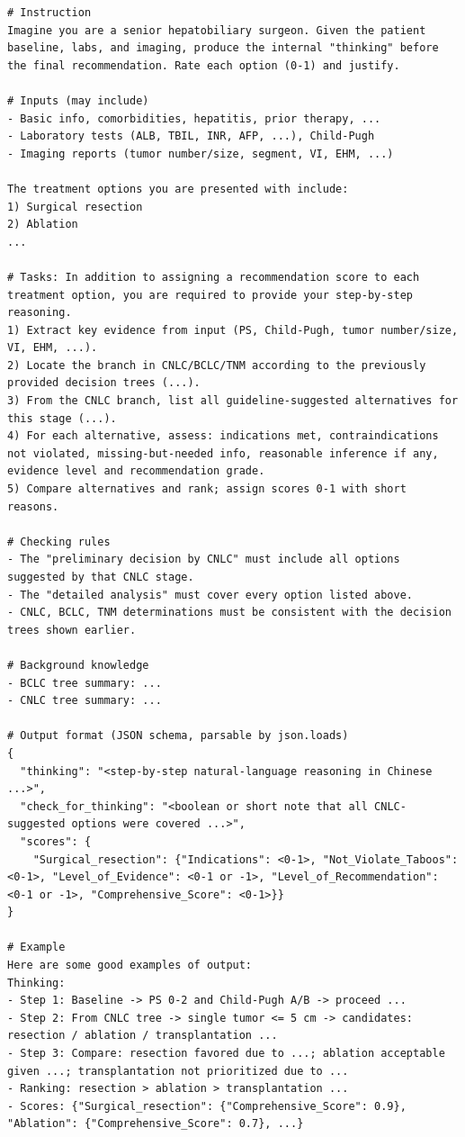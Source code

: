 \documentclass{article}
\begin{document}
\begin{appendices}
\begin{lstlisting}[style=promptmono,floatplacement=H,caption={Clinical-Reasoning prompt for generating thinking data},label={lst:hcc_prompt_thinking}]
# Instruction
Imagine you are a senior hepatobiliary surgeon. Given the patient baseline, labs, and imaging, produce the internal "thinking" before the final recommendation. Rate each option (0-1) and justify.

# Inputs (may include)
- Basic info, comorbidities, hepatitis, prior therapy, ...
- Laboratory tests (ALB, TBIL, INR, AFP, ...), Child-Pugh
- Imaging reports (tumor number/size, segment, VI, EHM, ...)

The treatment options you are presented with include:
1) Surgical resection
2) Ablation
...

# Tasks: In addition to assigning a recommendation score to each treatment option, you are required to provide your step-by-step reasoning. 
1) Extract key evidence from input (PS, Child-Pugh, tumor number/size, VI, EHM, ...).
2) Locate the branch in CNLC/BCLC/TNM according to the previously provided decision trees (...).
3) From the CNLC branch, list all guideline-suggested alternatives for this stage (...).
4) For each alternative, assess: indications met, contraindications not violated, missing-but-needed info, reasonable inference if any, evidence level and recommendation grade.
5) Compare alternatives and rank; assign scores 0-1 with short reasons.

# Checking rules
- The "preliminary decision by CNLC" must include all options suggested by that CNLC stage.
- The "detailed analysis" must cover every option listed above.
- CNLC, BCLC, TNM determinations must be consistent with the decision trees shown earlier.

# Background knowledge 
- BCLC tree summary: ...
- CNLC tree summary: ...

# Output format (JSON schema, parsable by json.loads)
{
  "thinking": "<step-by-step natural-language reasoning in Chinese ...>",
  "check_for_thinking": "<boolean or short note that all CNLC-suggested options were covered ...>",
  "scores": {
    "Surgical_resection": {"Indications": <0-1>, "Not_Violate_Taboos": <0-1>, "Level_of_Evidence": <0-1 or -1>, "Level_of_Recommendation": <0-1 or -1>, "Comprehensive_Score": <0-1>}}
}

# Example
Here are some good examples of output:
Thinking:
- Step 1: Baseline -> PS 0-2 and Child-Pugh A/B -> proceed ...
- Step 2: From CNLC tree -> single tumor <= 5 cm -> candidates: resection / ablation / transplantation ...
- Step 3: Compare: resection favored due to ...; ablation acceptable given ...; transplantation not prioritized due to ...
- Ranking: resection > ablation > transplantation ...
- Scores: {"Surgical_resection": {"Comprehensive_Score": 0.9}, "Ablation": {"Comprehensive_Score": 0.7}, ...}


\end{lstlisting}
\end{appendices}
\end{document}
